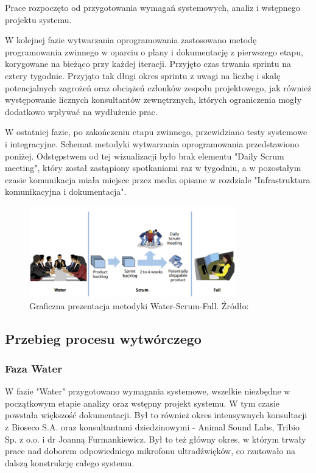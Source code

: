 \documentclass{sprz}
\begin{document}
Prace rozpoczęto od przygotowania wymagań systemowych, analiz i wstępnego projektu systemu. 

W kolejnej fazie wytwarzania oprogramowania zastosowano metodę programowania zwinnego w oparciu o plany i dokumentację z pierwszego etapu, korygowane na bieżąco przy każdej iteracji. Przyjęto czas trwania sprintu na cztery tygodnie. Przyjąto tak długi okres sprintu z uwagi na liczbę i skalę potencjalnych zagrożeń oraz obciążeń członków zespołu projektowego, jak również występowanie licznych konsultantów zewnętrznych, których ograniczenia mogły dodatkowo wpływać na wydłużenie prac. 

W ostatniej fazie, po zakończeniu etapu zwinnego, przewidziano testy systemowe i integracyjne. Schemat metodyki wytwarzania oprogramowania przedstawiono poniżej. Odstępstwem od tej wizualizacji było brak elementu "Daily Scrum meeting", który został zastąpiony spotkaniami raz w tygodniu, a w pozostałym czasie komunikacja miała miejsce przez media opisane w rozdziale "Infrastruktura komunikacyjna i dokumentacja". 

\begin{figure}[h]
  \centering
  \includegraphics[width=0.8\textwidth]{sprz/water-scrum-fall.png}
  \caption{Graficzna prezentacja metodyki Water-Scrum-Fall. Źródło: \cite{water-scrum-fall1}}
  \label{img:water-scrum-fall}
\end{figure}

\subsection{Przebieg procesu wytwórczego}

\subsubsection{Faza Water}
W fazie "Water" przygotowano wymagania systemowe, wszelkie niezbędne w początkowym etapie analizy oraz wstępny projekt systemu. W tym czasie powstała większość dokumentacji. Był to również okres intensywnych konsultacji z Bioseco S.A. oraz konsultantami dziedzinowymi - Animal Sound Labs, Tribio Sp. z o.o. i dr Joanną Furmankiewicz. Był to też główny okres, w którym trwały prace nad doborem odpowiedniego mikrofonu ultradźwięków, co rzutowało na dalszą konstrukcję całego systemu.
\end{document}
